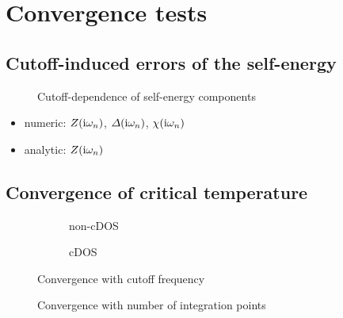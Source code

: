 \section{Convergence tests}

\subsection{Cutoff-induced errors of the self-energy}

\begin{figure}
    \small
    \begin{minipage}{4.666cm}
	    
    \end{minipage}%
    \begin{minipage}{4.666cm}
	    
    \end{minipage}%
    \begin{minipage}{4.666cm}
	    
    \end{minipage}%
	\caption{Cutoff-dependence of self-energy components}
\end{figure}

\begin{itemize}
    \item numeric: $Z(\mathrm i \omega_n)$, $\varDelta(\mathrm i \omega_n)$, $\chi(\mathrm i \omega_n)$
    \item analytic: $Z(\mathrm i \omega_n)$
\end{itemize}

\subsection{Convergence of critical temperature}

\begin{figure}
    \small
    \begin{subfigure}{7cm}
        
        \caption{non-cDOS}
    \end{subfigure}%
    \begin{subfigure}{7cm}
        
        \caption{cDOS}
    \end{subfigure}
    \caption{Convergence with cutoff frequency}
\end{figure}

\begin{figure}
    \small
    \centering
    
    \caption{Convergence with number of integration points}
\end{figure}

